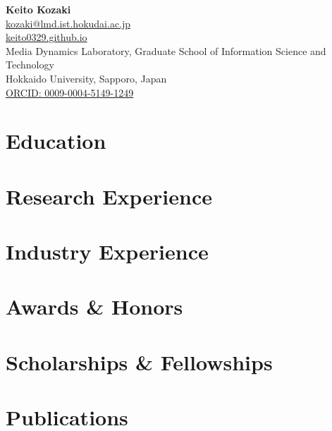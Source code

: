 \documentclass[11pt]{article} %
\newcommand{\mytitle}[4]{
  \begin{center}
    \Large\textbf{#1}\normalsize \\ %
    \href{mailto:#2}{#2} \\ %
    \href{https://#3}{#3} \\ %
    #4 %
  \end{center}
}
\begin{document}
\mytitle
    {Keito Kozaki}
    {kozaki@lmd.ist.hokudai.ac.jp}
    {keito0329.github.io}
    {Media Dynamics Laboratory, Graduate School of Information Science and Technology\\
     Hokkaido University, Sapporo, Japan\\
     \href{https://orcid.org/0009-0004-5149-1249}{ORCID: 0009-0004-5149-1249}}


\RaggedRight


\section*{Education}


\section*{Research Experience}
\label{exp_research}


\section*{Industry Experience}
\label{exp_industry}


\section*{Awards \& Honors}
\label{awards}


\section*{Scholarships \& Fellowships}
\label{scholarships}



\section*{Publications}
\label{pubs}
\end{document}
